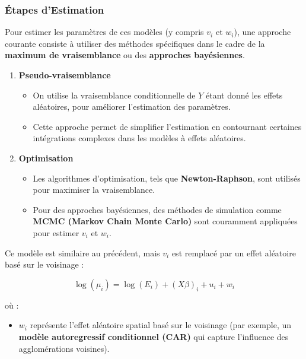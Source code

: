 \documentclass[
]{article}
\providecommand{\tightlist}{%
  \setlength{\itemsep}{0pt}\setlength{\parskip}{0pt}}
\begin{document}
\subsubsection{Étapes d'Estimation}\label{uxe9tapes-destimation}

Pour estimer les paramètres de ces modèles (y compris \(v_i\) et
\(w_i\)), une approche courante consiste à utiliser des méthodes
spécifiques dans le cadre de la \textbf{maximum de vraisemblance} ou des
\textbf{approches bayésiennes}.

\begin{enumerate}
\def\labelenumi{\arabic{enumi}.}
\tightlist
\item
  \textbf{Pseudo-vraisemblance}

  \begin{itemize}
  \tightlist
  \item
    On utilise la vraisemblance conditionnelle de \(Y\) étant donné les
    effets aléatoires, pour améliorer l'estimation des paramètres.
  \item
    Cette approche permet de simplifier l'estimation en contournant
    certaines intégrations complexes dans les modèles à effets
    aléatoires.
  \end{itemize}
\item
  \textbf{Optimisation}

  \begin{itemize}
  \tightlist
  \item
    Les algorithmes d'optimisation, tels que \textbf{Newton-Raphson},
    sont utilisés pour maximiser la vraisemblance.
  \item
    Pour des approches bayésiennes, des méthodes de simulation comme
    \textbf{MCMC (Markov Chain Monte Carlo)} sont couramment appliquées
    pour estimer \(v_i\) et \(w_i\).
  \end{itemize}
\end{enumerate}

Ce modèle est similaire au précédent, mais \(v_i\) est remplacé par un
effet aléatoire basé sur le voisinage :

\[
\log(\mu_i) = \log(E_i) + (X\beta)_i + u_i + w_i
\]

où :

\begin{itemize}
\tightlist
\item
  \(w_i\) représente l'effet aléatoire spatial basé sur le voisinage
  (par exemple, un \textbf{modèle autoregressif conditionnel (CAR)} qui
  capture l'influence des agglomérations voisines).
\end{itemize}
\end{document}
